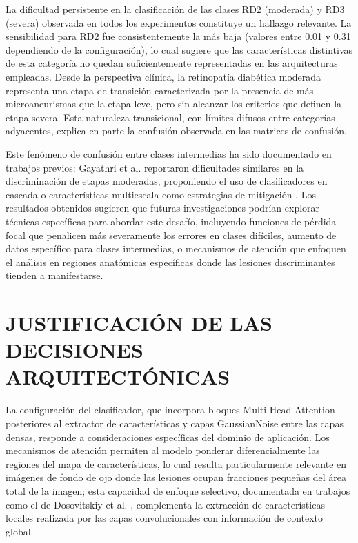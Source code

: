 La dificultad persistente en la clasificación de las clases RD2 (moderada) y RD3 (severa)
observada en todos los experimentos constituye un hallazgo relevante. La sensibilidad
para RD2 fue consistentemente la más baja (valores entre 0.01 y 0.31 dependiendo de la
configuración), lo cual sugiere que las características distintivas de esta categoría no
quedan suficientemente representadas en las arquitecturas empleadas. Desde la perspectiva
clínica, la retinopatía diabética moderada representa una etapa de transición
caracterizada por la presencia de más microaneurismas que la etapa leve, pero sin
alcanzar los criterios que definen la etapa severa. Esta naturaleza transicional, con
límites difusos entre categorías adyacentes, explica en parte la confusión observada en
las matrices de confusión.

Este fenómeno de confusión entre clases intermedias ha sido documentado en trabajos
previos: Gayathri et al. reportaron dificultades similares en la discriminación de etapas
moderadas, proponiendo el uso de clasificadores en cascada o características multiescala
como estrategias de mitigación . Los resultados
obtenidos sugieren que futuras investigaciones podrían explorar técnicas específicas para
abordar este desafío, incluyendo funciones de pérdida focal que penalicen más severamente
los errores en clases difíciles, aumento de datos específico para clases intermedias, o
mecanismos de atención que enfoquen el análisis en regiones anatómicas específicas donde
las lesiones discriminantes tienden a manifestarse.

\section{JUSTIFICACIÓN DE LAS DECISIONES ARQUITECTÓNICAS}

La configuración del clasificador, que incorpora bloques Multi-Head Attention posteriores
al extractor de características y capas GaussianNoise entre las capas densas, responde a
consideraciones específicas del dominio de aplicación. Los mecanismos de atención
permiten al modelo ponderar diferencialmente las regiones del mapa de características, lo
cual resulta particularmente relevante en imágenes de fondo de ojo donde las lesiones
ocupan fracciones pequeñas del área total de la imagen; esta capacidad de enfoque
selectivo, documentada en trabajos como el de Dosovitskiy et al.
, complementa la extracción de características locales
realizada por las capas convolucionales con información de contexto global.


